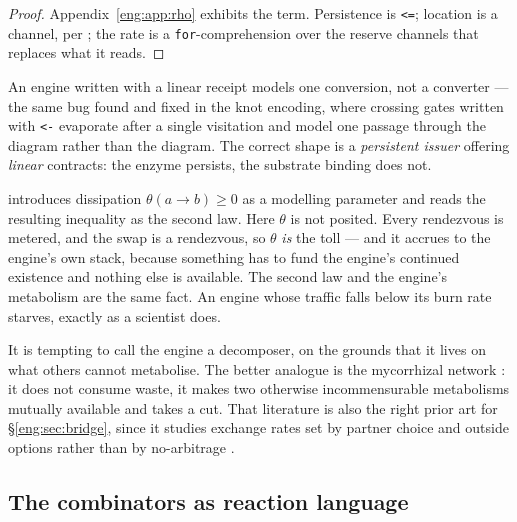 \begin{proof}
Appendix~\ref{eng:app:rho} exhibits the term. Persistence is \texttt{<=};
location is a channel, per \cite[\S2.2]{finrho}; the rate is a
\texttt{for}-comprehension over the reserve channels that replaces what it
reads.
\end{proof}

\begin{remark}\label{eng:persistence-load-bearing}
An engine written with a linear receipt models one conversion, not a
converter --- the same bug found and fixed in the knot encoding, where
crossing gates written with \texttt{<-} evaporate after a single
visitation and model one passage through the diagram rather than the
diagram. The correct shape is a \emph{persistent issuer} offering
\emph{linear} contracts: the enzyme persists, the substrate binding does
not.
\end{remark}

\begin{remark}\label{eng:rem:eats}
\cite[\S6]{vtok} introduces dissipation $\theta(a{\to}b) \geq 0$ as a
modelling parameter and reads the resulting inequality as the second law.
Here $\theta$ is not posited. Every rendezvous is metered, and the swap is
a rendezvous, so $\theta$ \emph{is} the toll --- and it accrues to the
engine's own stack, because something has to fund the engine's continued
existence and nothing else is available. The second law and the engine's
metabolism are the same fact. An engine whose traffic falls below its burn
rate starves, exactly as a scientist does.
\end{remark}

\begin{remark}\label{eng:decomposer}
It is tempting to call the engine a decomposer, on the grounds that it
lives on what others cannot metabolise. The better analogue is the
mycorrhizal network \cite{kiers}: it does not consume waste, it makes two
otherwise incommensurable metabolisms mutually available and takes a cut.
That literature is also the right prior art for
\S\ref{eng:sec:bridge}, since it studies exchange rates set by partner choice
and outside options rather than by no-arbitrage \cite{noe}.
\end{remark}

\subsection{The combinators as reaction language}\label{eng:S4.2}

